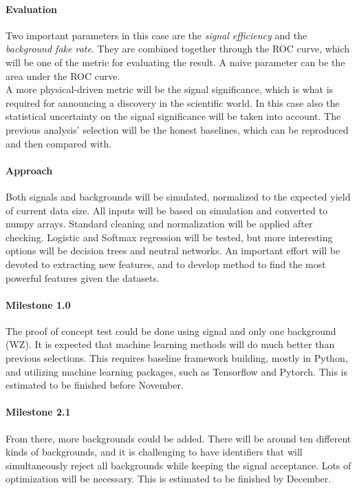 \documentclass[11pt]{article}
\begin{document}
\paragraph{Evaluation}
Two important parameters in this case are the \textit{signal efficiency} and the \textit{background fake rate}. They are combined together through the ROC curve, which will be one of the metric for evaluating the result. A naive parameter can be the area under the ROC curve.\\
A more physical-driven metric will be the signal significance, which is what is required for announcing a discovery in the scientific world. In this case also the statistical uncertainty on the signal significance will be taken into account. The previous analysis' selection will be the honest baselines, which can be reproduced and then compared with. 

\paragraph{Approach}
Both signals and backgrounds will be simulated, normalized to the expected yield of current data size. All inputs will be based on simulation and converted to numpy arrays. Standard cleaning and normalization will be applied after checking. Logistic and Softmax regression will be tested, but more interesting options will be decision trees and neutral networks. An important effort will be devoted to extracting new features, and to develop method to find the most powerful features given the datasets.

\paragraph{Milestone 1.0}
The proof of concept test could be done using signal and only one background (WZ). It is expected that machine learning methods will do much better than previous selections. This requires baseline framework building, mostly in Python, and utilizing machine learning packages, such as Tensorflow and Pytorch. This is estimated to be finished before November.

\paragraph{Milestone 2.1}
From there, more backgrounds could be added. There will be around ten different kinds of backgrounds, and it is challenging to have identifiers that will simultaneously reject all backgrounds while keeping the signal acceptance. Lots of optimization will be necessary. This is estimated to be finished by December.
\end{document}
